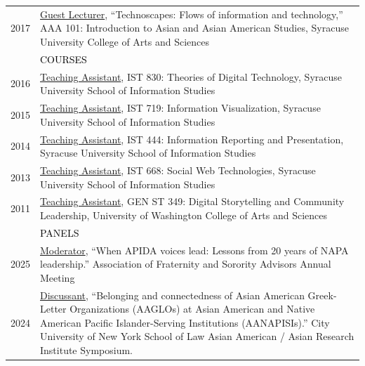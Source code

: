 \documentclass[12pt]{article}
\begin{document}
{\begin{longtable}{R{0.75in}p{5.0in}}
\footnotesize{2017} & 
\href{https://bit.ly/AAA_101}{Guest Lecturer}, ``Technoscapes: Flows of information and technology,'' AAA 101: Introduction to Asian and Asian American Studies, Syracuse University College of Arts and Sciences\medskip \\

& \large \textcolor{black}{\uppercase{Courses}}\\

\footnotesize{2016} & 
\href{https://drive.google.com/file/d/0B7pKGZ82YxcVX1Y3aUdDXzV0Umc/view?usp=sharing&resourcekey=0-3bEVsEyqUwEubgH6EXgtDg}{Teaching Assistant}, IST 830: Theories of Digital Technology, Syracuse University School of Information Studies\\

\footnotesize{2015} & 
\href{https://coursecatalog.syracuse.edu/}{Teaching Assistant}, IST 719: Information Visualization, Syracuse University School of Information Studies\\

\footnotesize{2014} & 
\href{http://coursecatalog.syr.edu/}{Teaching Assistant}, IST 444: Information Reporting and Presentation, Syracuse University School of Information Studies\\

\footnotesize{2013} & 
\href{http://coursecatalog.syr.edu/}{Teaching Assistant}, IST 668: Social Web Technologies, Syracuse University School of Information Studies\\

\footnotesize{2011} & 
\href{https://www.washington.edu/students/crscat/genst.html}{Teaching Assistant}, GEN ST 349: Digital Storytelling and Community Leadership,  University of Washington College of Arts and Sciences\medskip \\

& \large \textcolor{black}{\uppercase{Panels}}\\
\footnotesize{2025} &
\href{https://afa1976.secure-platform.com/site/gallery?roundId=82021}{Moderator}, ``When APIDA voices lead: Lessons from 20 years of NAPA leadership.'' Association of Fraternity and Sorority Advisors Annual Meeting\\
\footnotesize{2024} &
\href{https://aaari.info/24-05-17symposium/}{Discussant}, ``Belonging and connectedness of Asian American Greek-Letter Organizations (AAGLOs) at Asian American and Native American Pacific Islander-Serving Institutions (AANAPISIs).'' City University of New York School of Law Asian American / Asian Research Institute Symposium.\\


\end{longtable}}
\end{document}
